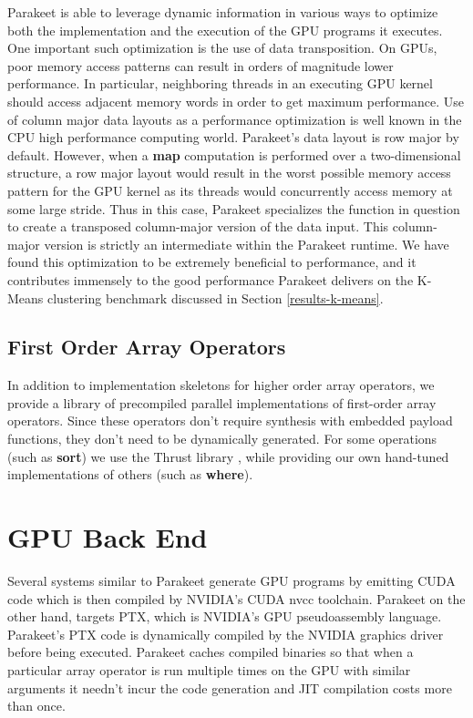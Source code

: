 \documentclass[preprint]{sigplanconf}
\begin{document}
Parakeet is able to leverage dynamic information in various ways to optimize both the implementation and the execution of the GPU programs it executes.  One important such optimization is the use of data transposition.  On GPUs, poor memory access patterns can result in orders of magnitude lower performance.  In particular, neighboring threads in an executing GPU kernel should access adjacent memory words in order to get maximum performance.  Use of column major data layouts as a performance optimization is well known in the CPU high performance computing world.  Parakeet's data layout is row major by default.  However, when a \textbf{map} computation is performed over a two-dimensional structure, a row major layout would result in the worst possible memory access pattern for the GPU kernel as its threads would concurrently access memory at some large stride.  Thus in this case, Parakeet specializes the function in question to create a transposed column-major version of the data input.  This column-major version is strictly an intermediate within the Parakeet runtime.  We have found this optimization to be extremely beneficial to performance, and it contributes immensely to the good performance Parakeet delivers on the K-Means clustering benchmark discussed in Section \ref{results-k-means}.

\subsection{First Order Array Operators}
In addition to implementation skeletons for higher order array operators, we provide a library of precompiled parallel implementations of first-order array operators. Since these operators don't require synthesis with embedded payload functions, they don't need to be dynamically generated. For some operations (such as \textbf{sort}) we use the Thrust library \cite{Hobe10}, while providing our own hand-tuned implementations of others (such as \textbf{where}).

\section{GPU Back End}
Several systems similar to Parakeet \cite{Cata11,Chaf11} generate GPU programs by emitting CUDA code which is then compiled by NVIDIA's CUDA nvcc toolchain. Parakeet on the other hand, targets PTX, which is NVIDIA's GPU pseudoassembly language. Parakeet's PTX code is dynamically compiled by the NVIDIA graphics driver before being executed.  Parakeet caches compiled binaries so that when a particular array operator is run multiple times on the GPU with similar arguments it needn't incur the code generation and JIT compilation costs more than once.
\end{document}
